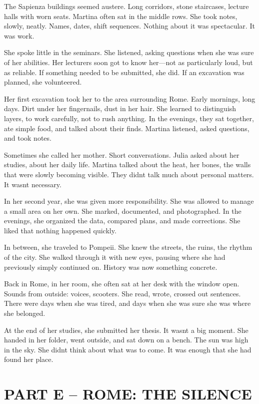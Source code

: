 \documentclass[
]{article}
\begin{document}
The Sapienza buildings seemed austere. Long corridors, stone staircases, lecture halls with worn seats. Martina often sat in the middle rows. She took notes, slowly, neatly. Names, dates, shift sequences. Nothing about it was spectacular. It was work.

She spoke little in the seminars. She listened, asking questions when she was sure of her abilities. Her lecturers soon got to know her---not as particularly loud, but as reliable. If something needed to be submitted, she did. If an excavation was planned, she volunteered.

Her first excavation took her to the area surrounding Rome. Early mornings, long days. Dirt under her fingernails, dust in her hair. She learned to distinguish layers, to work carefully, not to rush anything. In the evenings, they sat together, ate simple food, and talked about their finds. Martina listened, asked questions, and took notes.

Sometimes she called her mother. Short conversations. Julia asked about her studies, about her daily life. Martina talked about the heat, her bones, the walls that were slowly becoming visible. They didn\textquotesingle t talk much about personal matters. It wasn\textquotesingle t necessary.

In her second year, she was given more responsibility. She was allowed to manage a small area on her own. She marked, documented, and photographed. In the evenings, she organized the data, compared plans, and made corrections. She liked that nothing happened quickly.

In between, she traveled to Pompeii. She knew the streets, the ruins, the rhythm of the city. She walked through it with new eyes, pausing where she had previously simply continued on. History was now something concrete.

Back in Rome, in her room, she often sat at her desk with the window open. Sounds from outside: voices, scooters. She read, wrote, crossed out sentences. There were days when she was tired, and days when she was sure she was where she belonged.

At the end of her studies, she submitted her thesis. It wasn\textquotesingle t a big moment. She handed in her folder, went outside, and sat down on a bench. The sun was high in the sky. She didn\textquotesingle t think about what was to come. It was enough that she had found her place.

\section{PART E -- ROME: THE SILENCE}\label{part-e-rome-the-silence}
\end{document}
